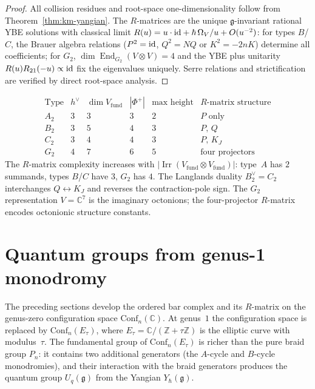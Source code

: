 \begin{proof}
All collision residues and root-space one-dimensionality
follow from Theorem~\ref{thm:km-yangian}. The $R$-matrices
are the unique $\mathfrak{g}$-invariant rational YBE solutions
with classical limit $R(u) = u\cdot\mathrm{id} + \hbar\,\Omega_V/u
+ O(u^{-2})$: for types $B$/$C$, the Brauer algebra relations
($P^2=\mathrm{id}$, $Q^2=NQ$ or $K^2=-2nK$) determine
all coefficients; for $G_2$,
$\dim\operatorname{End}_{G_2}(V\otimes V)=4$ and the YBE
plus unitarity $R(u)R_{21}(-u)\propto\mathrm{id}$ fix the eigenvalues
uniquely. Serre relations and strictification
are verified by direct root-space analysis.
\end{proof}

\begin{remark}
\label{rem:rank-2-comparison}
\label{rem:langlands-ordered-bar}
\label{rem:G2-octonion}
\label{rem:b2-c2-isogeny}
\[
\begin{array}{c|ccccc}
\text{Type} & h^\vee & \dim V_{\mathrm{fund}}
& |\Phi^+| & \text{max height} & R\text{-matrix structure} \\
\hline
A_2 & 3 & 3 & 3 & 2 & P \text{ only} \\
B_2 & 3 & 5 & 4 & 3 & P,\, Q \\
C_2 & 3 & 4 & 4 & 3 & P,\, K_J \\
G_2 & 4 & 7 & 6 & 5 & \text{four projectors}
\end{array}
\]
The $R$-matrix complexity increases with
$|\operatorname{Irr}(V_{\mathrm{fund}} \otimes V_{\mathrm{fund}})|$:
type~$A$ has $2$ summands, types $B$/$C$ have $3$, $G_2$
has $4$.
The Langlands duality $B_2^\vee = C_2$ interchanges
$Q \leftrightarrow K_J$ and reverses the contraction-pole sign.
The $G_2$ representation $V = \mathbb{C}^7$ is the imaginary
octonions; the four-projector $R$-matrix encodes octonionic
structure constants.
\end{remark}
\section{Quantum groups from genus-1 monodromy}
\label{sec:genus1-monodromy}

The preceding sections develop the ordered bar complex and its $R$-matrix
on the genus-zero configuration space $\mathrm{Conf}_n(\mathbb{C})$.
At genus~$1$ the configuration space is replaced by
$\mathrm{Conf}_n(E_\tau)$, where $E_\tau = \mathbb{C}/(\mathbb{Z}
+ \tau\mathbb{Z})$ is the elliptic curve with modulus~$\tau$.
The fundamental group of $\mathrm{Conf}_n(E_\tau)$ is
richer than the pure braid group $P_n$: it contains two
additional generators (the $A$-cycle and $B$-cycle monodromies),
and their interaction with the braid generators produces the quantum
group $U_q(\mathfrak{g})$ from the Yangian $Y_\hbar(\mathfrak{g})$.

